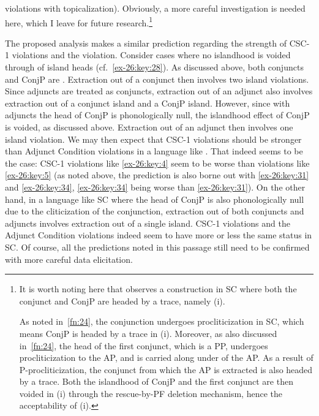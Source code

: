 \documentclass[output=paper]{langsci/langscibook}
\begin{document}
violations with  topicalization). Obviously, a more careful
investigation is needed here, which I leave for future research.\footnote{It
    is worth noting here that \textcite{Odainpress} observes a construction in
    \gls{SC} where both the conjunct and ConjP are headed by a trace, namely
    (i).

\z

As noted in~\cref{fn:24}, the conjunction undergoes procliticization in
\gls{SC}, which means ConjP is headed by a trace in (i). Moreover, as also
discussed in~\cref{fn:24}, the head of the first conjunct, which is a PP,
undergoes procliticization to the AP, and is carried along under  of
the AP. As a result of P-procliticization, the conjunct from which the AP is
extracted is also headed by a trace. Both the islandhood of ConjP and the first
conjunct are then voided in (i) through the rescue-by-\gls{PF} deletion mechanism,
hence the acceptability of (i).}

The proposed analysis makes a similar prediction regarding the strength of
CSC-1 violations and the  violation. Consider cases where no
islandhood is voided through  of island heads (cf.\ \eqref{ex-26:key:28}). As discussed
above, both conjuncts and ConjP are . Extraction out of a conjunct then
involves two island violations. Since adjuncts are treated as conjuncts,
extraction out of an adjunct also involves extraction out of a conjunct island
and a ConjP island. However, since with adjuncts the head of ConjP is
phonologically null, the islandhood effect of ConjP is voided, as discussed
above. Extraction out of an adjunct then involves one island violation. We may
then expect that CSC-1 violations should be stronger than Adjunct Condition
violations in a language like . That indeed seems to be the case: CSC-1
violations like \eqref{ex-26:key:4} seem to be worse than  violations like
\eqref{ex-26:key:5} (as noted above, the prediction is also borne out with  \eqref{ex-26:key:31} and \eqref{ex-26:key:34},
\eqref{ex-26:key:34} being worse than \eqref{ex-26:key:31}). On the other hand, in a language like \gls{SC}
where the head of ConjP is also phonologically null due to the cliticization of
the conjunction, extraction out of both conjuncts and adjuncts involves
extraction out of a single island. CSC-1 violations and the Adjunct Condition
violations indeed seem to have more or less the same status in \gls{SC}. Of course,
all the predictions noted in this passage still need to be confirmed with more
careful data elicitation.
\end{document}
